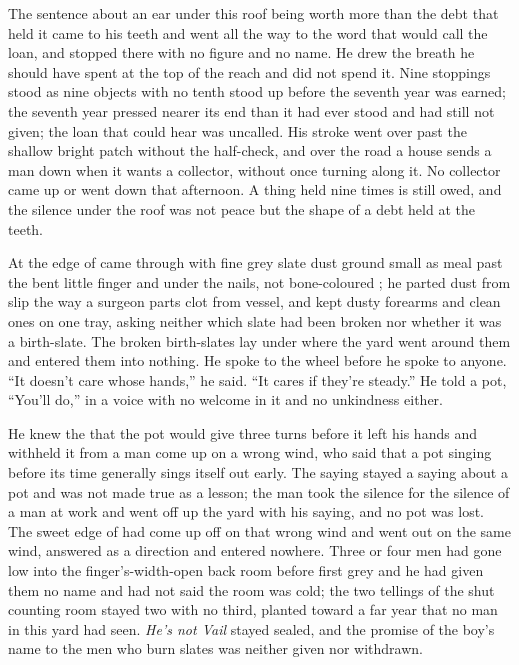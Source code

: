 The sentence about an ear under this roof being worth more than the debt that held it came to his teeth and went all the way to the word that would call the loan, and stopped there with no figure and no name. He drew the breath he should have spent at the top of the reach and did not spend it. Nine stoppings stood as nine objects with no tenth stood up before the seventh year was earned; the seventh year pressed nearer its end than it had ever stood and had still not given; the loan that could hear was uncalled. His stroke went over  past the shallow bright patch without the half-check, and over the road a house sends a man down when it wants a collector, without once turning along it. No collector came up or went down  that afternoon. A thing held nine times is still owed, and the silence under the roof was not peace but the shape of a debt held at the teeth.

\scenebreak

At the edge of   came through with fine grey slate dust ground small as meal past the bent little finger and under the nails, not bone-coloured ; he parted dust from slip the way a surgeon parts clot from vessel, and kept dusty forearms and clean ones on one tray, asking neither which slate had been broken nor whether it was a birth-slate. The broken birth-slates lay under  where the yard went around them and entered them into nothing. He spoke to the wheel before he spoke to anyone. “It doesn't care whose hands,” he said. “It cares if they're steady.” He told a pot, “You'll do,” in a voice with no welcome in it and no unkindness either.

He knew the  that the pot would give three turns before it left his hands and withheld it from a man come up on a wrong wind, who said that a pot singing before its time generally sings itself out early. The saying stayed a saying about a pot and was not made true as a lesson; the man took the silence for the silence of a man at work and went off up the yard with his saying, and no pot was lost. The sweet edge of  had come up off  on that wrong wind and went out on the same wind, answered as a direction and entered nowhere. Three or four men had gone low into the finger's-width-open back room before first grey and he had given them no name and had not said the room was cold; the two tellings of the shut counting room stayed two with no third, planted toward a far year that no man in this yard had seen. \emph{He's not Vail} stayed sealed, and the promise of the boy's name to the men who burn slates was neither given nor withdrawn.

